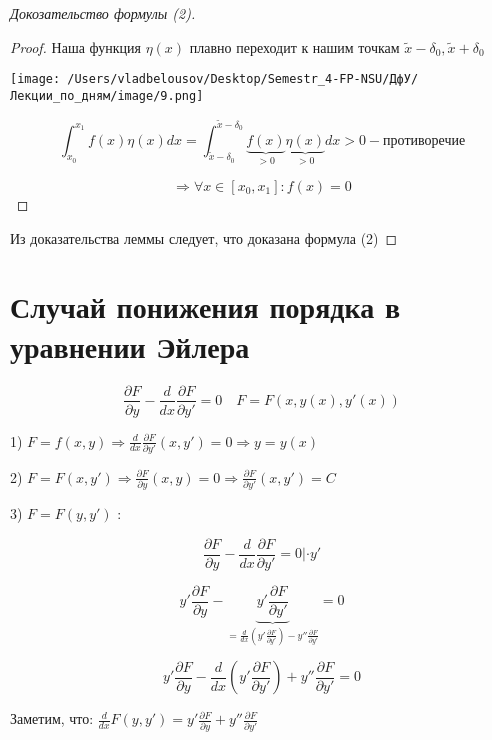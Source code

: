 \documentclass[12pt, a4paper]{report}
\begin{document}
\begin{proof}[Докозательство формулы (2)]
\begin{proof}
        Наша функция \( \eta (x )   \) плавно переходит к нашим точкам \( \tilde{x } - \delta_0, \tilde{x }+ \delta_0 \) 
        
        \begin{center}
            \texttt{[image: /Users/vladbelousov/Desktop/Semestr\_4-FP-NSU/ДфУ/Лекции\_по\_дням/image/9.png]}
        \end{center}

        \[ \int_{ x_0 }^{x_1} f(x ) \eta(x ) dx = \int_{\tilde{x} - \delta_0}^{\tilde{x}- \delta_0} \underbrace{f(x)}_{>0} \underbrace{\eta( x)}_{>0} dx >0 - \text{противоречие}    \] 

        \[ \Rightarrow \forall x \in  [x_0, x_1] : f(x) = 0  \] 
    \end{proof}

    Из доказательства леммы следует, что доказана формула (2)
\end{proof}

\section{Случай понижения порядка в уравнении Эйлера}   

\[ \frac{\partial F}{\partial y} - \frac{d}{d x }  \frac{\partial F}{\partial y'} = 0 \quad  F=F(x,y(x),y'(x))  \] 

1) \(\displaystyle  F= f(x,y) \Rightarrow \frac{d}{dx }  \frac{\partial F }{\partial y'} (x,y') =0 \Rightarrow y= y(x)    \) 

2) \( \displaystyle F= F (x, y ') \Rightarrow \frac{\partial F }{\partial y} (x,y) =0 \Rightarrow \frac{\partial F }{\partial y'} (x,y') = C    \) 


3) \( F= F( y , y ') \) :

\[ \frac{\partial F }{\partial y } - \frac{d}{dx }  \frac{\partial F }{\partial y '} = 0 | \cdot y '     \] 

\[ y' \frac{\partial F }{\partial y } - \underbrace{y ' \frac{ \partial F }{\partial y '}}_{= \frac{d}{dx } \left( y ' \frac{\partial F }{\partial y '} \right)- y'' \frac{\partial F }{\partial y '} }    = 0 \] 

\[ y' \frac{\partial F }{\partial y } - \frac{d}{dx } \left( y ' \frac{\partial F }{\partial y '}  \right)+ y'' \frac{\partial F }{\partial y '}  = 0 \] 

Заметим, что: \( \displaystyle \frac{d}{dx }F(y,y')  = y' \frac{\partial F }{\partial y } + y '' \frac{\partial F }{\partial y '}   \) 
\end{document}
